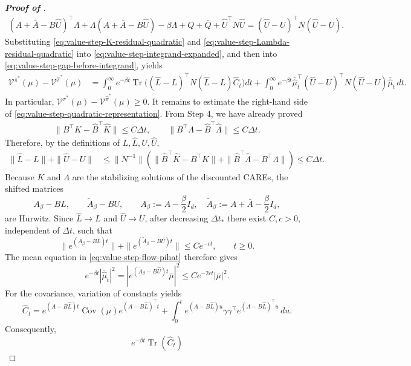 \documentclass[a4paper, 10pt, english, reqno]{amsart}
\begin{document}
\begin{proof}[\textbf{Proof of }]
\begin{align}
\label{eq:value-step-Lambda-residual-quadratic}
(A+\bar A-B\hat U)^\top\Lambda+\Lambda(A+\bar A-B\hat U)-\beta\Lambda+Q+\bar Q+\hat U^\top N\hat U
=
(\hat U-U)^\top N(\hat U-U).
\end{align}
Substituting \eqref{eq:value-step-K-residual-quadratic} and \eqref{eq:value-step-Lambda-residual-quadratic} into \eqref{eq:value-step-integrand-expanded}, and then into \eqref{eq:value-step-gap-before-integrand}, yields
\begin{align}
\label{eq:value-step-quadratic-representation}
\mathcal V^{\pi^*}(\mu)-\mathcal V^{\hat\pi^*}(\mu)
&=
\int_0^\infty e^{-\beta t}
\operatorname{Tr}\bigl((\hat L-L)^\top N(\hat L-L)\hat C_t\bigr)dt
+
\int_0^\infty e^{-\beta t}
\bar{\hat\mu}_t^\top(\hat U-U)^\top N(\hat U-U)\bar{\hat\mu}_t\,dt .
\end{align}
In particular, $\mathcal V^{\pi^*}(\mu)-\mathcal V^{\hat\pi^*}(\mu)\ge0.$ It remains to estimate the right-hand side of \eqref{eq:value-step-quadratic-representation}. From Step 4, we have already proved
\begin{align}
\label{eq:value-step-product-errors}
\|B^\top K-\hat B^\top\hat K\|\le C\Delta t,
\qquad
\|B^\top\Lambda-\hat B^\top\hat\Lambda\|\le C\Delta t .
\end{align}
Therefore, by the definitions of $L,\hat L,U,\hat U$,
\begin{align}
\label{eq:value-step-L-U-errors}
\|\hat L-L\|+\|\hat U-U\|
&\le
\|N^{-1}\|
\left(
\|\hat B^\top\hat K-B^\top K\|
+
\|\hat B^\top\hat\Lambda-B^\top\Lambda\|
\right)
\le C\Delta t .
\end{align}
Because $K$ and $\Lambda$ are the stabilizing solutions of the
discounted CAREs, the shifted matrices
\[
A_\beta-BL,
\qquad
\widetilde A_\beta-BU,
\qquad
A_\beta:=A-\frac\beta2I_d,
\quad
\widetilde A_\beta:=A+\bar A-\frac\beta2I_d,
\]
are Hurwitz. Since $\hat L\to L$ and $\hat U\to U$, after decreasing
$\Delta t_*$ there exist $C,c>0$, independent of $\Delta t$, such that
\[
\|e^{(A_\beta-B\hat L)t}\|
+
\|e^{(\widetilde A_\beta-B\hat U)t}\|
\le Ce^{-ct},
\qquad t\ge0.
\]
The mean equation in \eqref{eq:value-step-flow-pihat} therefore gives
\[
e^{-\beta t}|\bar{\hat\mu}_t|^2
=
\left|
e^{(\widetilde A_\beta-B\hat U)t}\bar\mu
\right|^2
\le
Ce^{-2ct}|\bar\mu|^2.
\]
For the covariance, variation of constants yields
\[
\hat C_t
=
e^{(A-B\hat L)t}\operatorname{Cov}(\mu)
e^{(A-B\hat L)^\top t}
+
\int_0^t
e^{(A-B\hat L)u}\gamma\gamma^\top
e^{(A-B\hat L)^\top u}\,du.
\]
Consequently,
\[
e^{-\beta t}\operatorname{Tr}(\hat C_t)
\]
\end{proof}
\end{document}
